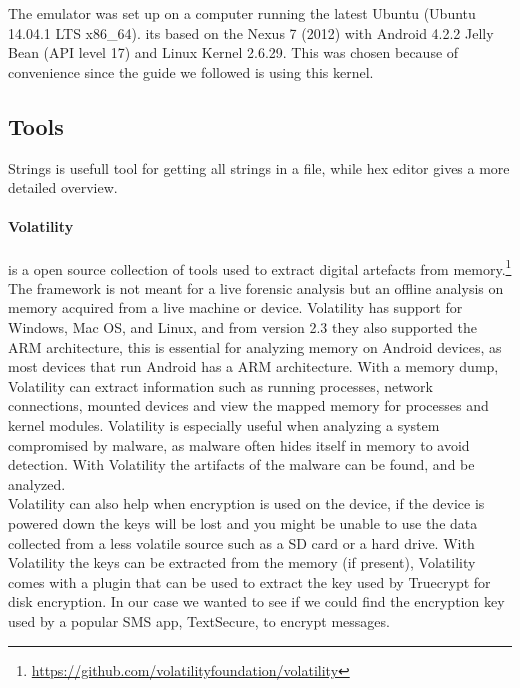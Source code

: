 The emulator was set up on a computer running the latest Ubuntu (Ubuntu 14.04.1 LTS x86\_64).
its based on the Nexus 7 (2012) with Android 4.2.2 Jelly Bean 
(API level 17) and Linux Kernel 2.6.29. This was chosen because of convenience
since the guide we followed is using this kernel.
\subsection{Tools}
Strings is usefull tool for getting all strings in a file, while hex editor gives a more detailed overview.
\paragraph{Volatility} is a open source collection of tools used to extract digital
  artefacts from memory.\footnote{\url{https://github.com/volatilityfoundation/volatility}} 
  The framework is not meant for a live forensic analysis but an offline analysis
  on memory acquired from a live machine or device. Volatility has support for Windows, Mac OS, and Linux, and
  from version 2.3 they also supported the ARM architecture, this is essential
  for analyzing memory on Android devices, as most devices that run Android has a
  ARM architecture. With a memory dump, Volatility can extract information such as
  running processes, network connections, mounted devices and view the mapped
  memory for processes and kernel modules. Volatility is especially useful when
  analyzing a system compromised by malware, as malware often hides itself in
  memory to avoid detection. With Volatility the artifacts of the malware can be
  found, and be analyzed. \\
  
  Volatility can also help when encryption is used on the device, if the device is
  powered down the keys will be lost and you might be unable to use the data 
  collected from a less volatile source such as a SD card or a hard drive. With
  Volatility the keys can be extracted from the memory (if present), Volatility 
  comes with a plugin that can be used to extract the key used by Truecrypt for 
  disk encryption. In our case we wanted to see if we could find the encryption
  key used by a popular SMS app, TextSecure, to encrypt messages.\\
  
